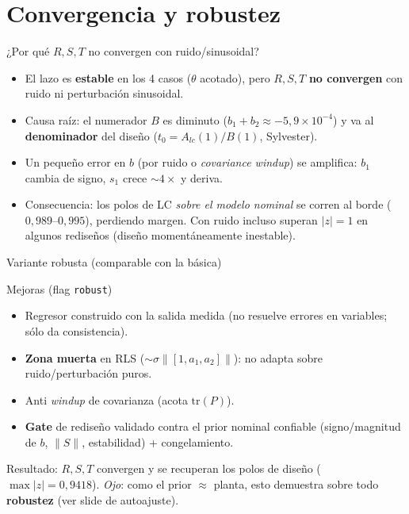 \documentclass{beamer}
\begin{document}
\section{Convergencia y robustez}

\begin{frame}{¿Por qué $R,S,T$ no convergen con ruido/sinusoidal?}
\begin{itemize}
  \item El lazo es \textbf{estable} en los 4 casos ($\theta$ acotado), pero
  $R,S,T$ \textbf{no convergen} con ruido ni perturbación sinusoidal.
  \item Causa raíz: el numerador $B$ es diminuto ($b_1{+}b_2\approx-5{,}9\times10^{-4}$)
  y va al \textbf{denominador} del diseño ($t_0=A_{lc}(1)/B(1)$, Sylvester).
  \item Un pequeño error en $b$ (por ruido o \emph{covariance windup}) se
  amplifica: $b_1$ cambia de signo, $s_1$ crece $\sim4\times$ y deriva.
  \item Consecuencia: los polos de LC \emph{sobre el modelo nominal} se corren al
  borde ($0{,}989$--$0{,}995$), perdiendo margen. Con ruido incluso superan
  $|z|=1$ en algunos rediseños (diseño momentáneamente inestable).
\end{itemize}
\end{frame}

\begin{frame}{Variante robusta (comparable con la básica)}
\begin{block}{Mejoras (flag \texttt{robust})}
\begin{itemize}
  \item Regresor construido con la salida medida (no resuelve errores en
  variables; sólo da consistencia).
  \item \textbf{Zona muerta} en RLS ($\sim\sigma\lVert[1,a_1,a_2]\rVert$): no
  adapta sobre ruido/perturbación puros.
  \item Anti \emph{windup} de covarianza (acota $\mathrm{tr}(P)$).
  \item \textbf{Gate} de rediseño validado contra el prior nominal confiable
  (signo/magnitud de $b$, $\lVert S\rVert$, estabilidad) + congelamiento.
\end{itemize}
\end{block}
Resultado: $R,S,T$ convergen y se recuperan los polos de diseño
($\max|z|=0{,}9418$). \emph{Ojo}: como el prior $\approx$ planta, esto demuestra
sobre todo \textbf{robustez} (ver slide de autoajuste).
\end{frame}
\end{document}
